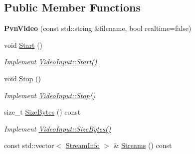 \subsection*{Public Member Functions}
\begin{DoxyCompactItemize}
\item 
{\bfseries Pvn\+Video} (const std\+::string \&filename, bool realtime=false)\hypertarget{classpangolin_1_1_pvn_video_a400eea7ffd4dd3b470ddc184028d2c2b}{}\label{classpangolin_1_1_pvn_video_a400eea7ffd4dd3b470ddc184028d2c2b}

\item 
void \hyperlink{classpangolin_1_1_pvn_video_a9228cafe6aca4fb7464a6a1d1e6abc9d}{Start} ()\hypertarget{classpangolin_1_1_pvn_video_a9228cafe6aca4fb7464a6a1d1e6abc9d}{}\label{classpangolin_1_1_pvn_video_a9228cafe6aca4fb7464a6a1d1e6abc9d}

\begin{DoxyCompactList}\small\item\em Implement \hyperlink{structpangolin_1_1_video_input_a74a2e3e1b87c7cbf9de9bcb39e1df128}{Video\+Input\+::\+Start()} \end{DoxyCompactList}\item 
void \hyperlink{classpangolin_1_1_pvn_video_a62be1cc72d780a6fc96f603b8a1f3e35}{Stop} ()\hypertarget{classpangolin_1_1_pvn_video_a62be1cc72d780a6fc96f603b8a1f3e35}{}\label{classpangolin_1_1_pvn_video_a62be1cc72d780a6fc96f603b8a1f3e35}

\begin{DoxyCompactList}\small\item\em Implement \hyperlink{structpangolin_1_1_video_input_a8945f80194cc7ec9594db7f27e7d09b8}{Video\+Input\+::\+Stop()} \end{DoxyCompactList}\item 
size\+\_\+t \hyperlink{classpangolin_1_1_pvn_video_ae64b6281bae28d96d4972d21a9898797}{Size\+Bytes} () const \hypertarget{classpangolin_1_1_pvn_video_ae64b6281bae28d96d4972d21a9898797}{}\label{classpangolin_1_1_pvn_video_ae64b6281bae28d96d4972d21a9898797}

\begin{DoxyCompactList}\small\item\em Implement \hyperlink{structpangolin_1_1_video_input_a93cee5c33386973a2a51165e6bdcf40b}{Video\+Input\+::\+Size\+Bytes()} \end{DoxyCompactList}\item 
const std\+::vector$<$ \hyperlink{classpangolin_1_1_stream_info}{Stream\+Info} $>$ \& \hyperlink{classpangolin_1_1_pvn_video_a3c18009ef903c82fd4009ebc635020ae}{Streams} () const \hypertarget{classpangolin_1_1_pvn_video_a3c18009ef903c82fd4009ebc635020ae}{}\label{classpangolin_1_1_pvn_video_a3c18009ef903c82fd4009ebc635020ae}


\end{DoxyCompactItemize}
